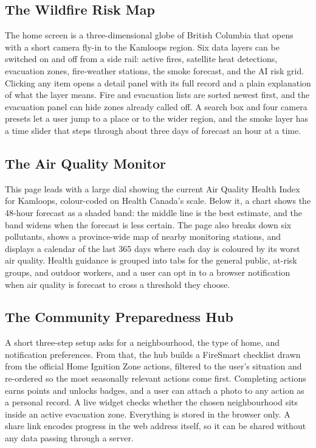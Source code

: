 \documentclass[11pt]{article}
\begin{document}
\subsection{The Wildfire Risk Map}

The home screen is a three-dimensional globe of British Columbia that opens
with a short camera fly-in to the Kamloops region. Six data layers can be
switched on and off from a side rail: active fires, satellite heat detections,
evacuation zones, fire-weather stations, the smoke forecast, and the AI risk
grid. Clicking any item opens a detail panel with its full record and a plain
explanation of what the layer means. Fire and evacuation lists are sorted
newest first, and the evacuation panel can hide zones already called off. A
search box and four camera presets let a user jump to a place or to the wider
region, and the smoke layer has a time slider that steps through about three
days of forecast an hour at a time.

\subsection{The Air Quality Monitor}

This page leads with a large dial showing the current Air Quality Health Index
for Kamloops, colour-coded on Health Canada's scale. Below it, a chart shows the
48-hour forecast as a shaded band: the middle line is the best estimate, and the
band widens when the forecast is less certain. The page also breaks down six
pollutants, shows a province-wide map of nearby monitoring stations, and
displays a calendar of the last 365 days where each day is coloured by its worst
air quality. Health guidance is grouped into tabs for the general public,
at-risk groups, and outdoor workers, and a user can opt in to a browser
notification when air quality is forecast to cross a threshold they choose.

\subsection{The Community Preparedness Hub}

A short three-step setup asks for a neighbourhood, the type of home, and
notification preferences. From that, the hub builds a FireSmart checklist drawn
from the official Home Ignition Zone actions, filtered to the user's situation
and re-ordered so the most seasonally relevant actions come first. Completing
actions earns points and unlocks badges, and a user can attach a photo to any
action as a personal record. A live widget checks whether the chosen
neighbourhood sits inside an active evacuation zone. Everything is stored in the
browser only. A share link encodes progress in the web address itself, so it can
be shared without any data passing through a server.
\end{document}
